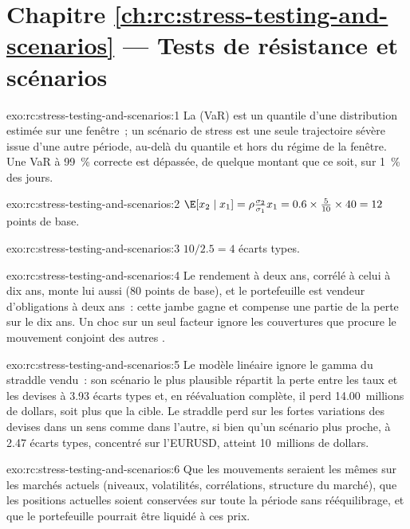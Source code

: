 \section*{Chapitre \ref{ch:rc:stress-testing-and-scenarios} --- Tests de résistance et scénarios}

\begin{solution}{exo:rc:stress-testing-and-scenarios:1}
La  (VaR) est un quantile d'une distribution estimée sur une fenêtre~; un scénario de stress est une seule trajectoire sévère
issue d'une autre période, au-delà du quantile et hors du régime de la fenêtre. Une VaR à 99~\% correcte
est dépassée, de quelque montant que ce soit, sur 1~\% des jours.
\end{solution}

\begin{solution}{exo:rc:stress-testing-and-scenarios:2}
$\E[x_2\mid x_1] = \rho\frac{\sigma_2}{\sigma_1}x_1 = 0.6\times\frac{5}{10}\times40 = 12$ points de base.
\end{solution}

\begin{solution}{exo:rc:stress-testing-and-scenarios:3}
$10/2.5 = 4$ écarts types.
\end{solution}

\begin{solution}{exo:rc:stress-testing-and-scenarios:4}
Le rendement à deux ans, corrélé à celui à dix ans, monte lui aussi (80 points de base), et le portefeuille est vendeur
d'obligations à deux ans~: cette jambe gagne et compense une partie de la perte sur le dix ans. Un choc sur un seul facteur
ignore les couvertures que procure le mouvement conjoint des autres .
\end{solution}

\begin{solution}{exo:rc:stress-testing-and-scenarios:5}
Le modèle linéaire ignore le gamma du straddle vendu~: son scénario le plus plausible répartit la perte entre les taux et les devises
à 3.93 écarts types et, en réévaluation complète, il perd 14.00~millions de dollars, soit plus que la cible. Le straddle perd
sur les fortes variations des devises dans un sens comme dans l'autre, si bien qu'un scénario plus proche,
à 2.47 écarts types, concentré sur l'EURUSD, atteint 10~millions de dollars.
\end{solution}

\begin{solution}{exo:rc:stress-testing-and-scenarios:6}
Que les mouvements seraient les mêmes sur les marchés actuels (niveaux, volatilités, corrélations, structure du marché),
que les positions actuelles soient conservées sur toute la période sans rééquilibrage,
et que le portefeuille pourrait être liquidé à ces prix.
\end{solution}

